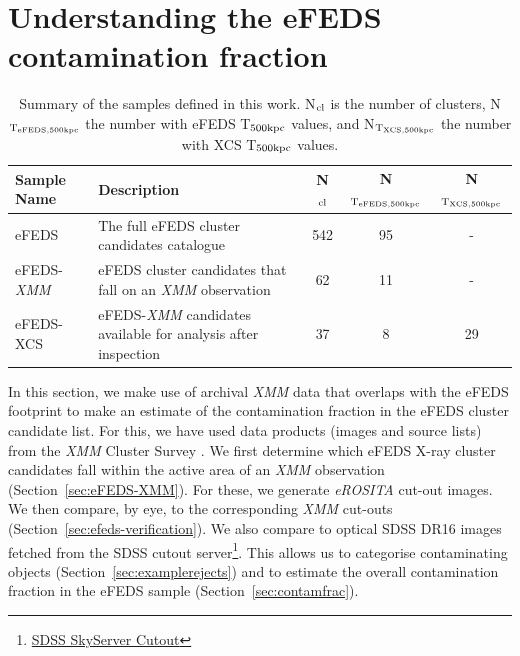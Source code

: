 \documentclass[fleqn,usenatbib]{mnras}
\begin{document}
\section{Understanding the \lowercase{e}FEDS contamination fraction}


\label{sec:efedsxmm}

\begin{table}
\begin{center}
\caption[]{{Summary of the samples defined in this work. N$_{\rm{cl}}$ is the number of clusters, N$_{\rm{T}_{\rm{eFEDS, 500kpc}}}$ the number with eFEDS T$_{\rm{500kpc}}$ values, and N$_{\rm{T}_{\rm{XCS, 500kpc}}}$ the number with XCS T$_{\rm{500kpc}}$ values.}\label{tab:samples}}
\vspace{1mm}
\begin{tabular}{l|lccc}
\hline
\hline
Sample Name & Description & N$_{\rm{cl}}$ & N$_{\rm{T}_{\rm{eFEDS, 500kpc}}}$ & N$_{\rm{T}_{\rm{XCS, 500kpc}}}$\\
\hline
\hline
eFEDS & The full eFEDS cluster candidates catalogue & 542 & 95 & - \\
\hline
eFEDS-{\em XMM} & eFEDS cluster candidates that fall on an {\em XMM} observation & 62 & 11 & - \\
\hline
eFEDS-XCS & eFEDS-{\em XMM} candidates available for analysis after inspection & 37 & 8 & 29 \\
\hline
\end{tabular}
\end{center}
\end{table}

In this section, we make use of archival {\em XMM} data that overlaps with the eFEDS footprint to make an estimate of the contamination fraction in the eFEDS cluster candidate list.  For this, we have used data products (images and source lists) from the {\em XMM} Cluster Survey \citep[XCS,][]{xcsfoundation}. We first determine which eFEDS X-ray cluster candidates fall within the active area of an {\em XMM} observation (Section~\ref{sec:eFEDS-XMM}). For these, we generate {\em eROSITA} cut-out images. We then compare, by eye, to the corresponding {\em XMM} cut-outs (Section~\ref{sec:efeds-verification}). We also compare to optical SDSS DR16 \citep[][]{dr16} images fetched from the SDSS cutout server\footnote{\href{https://skyserver.sdss.org/dr16/SkyserverWS/ImgCutout/getjpeg?ra=134.07450039749338&dec=-1.6358207558060298&width=1631&height=1631}{SDSS SkyServer Cutout}}. This allows us to categorise contaminating objects  (Section~\ref{sec:examplerejects}) and to estimate the overall contamination fraction in the eFEDS sample (Section~\ref{sec:contamfrac}).
\end{document}

